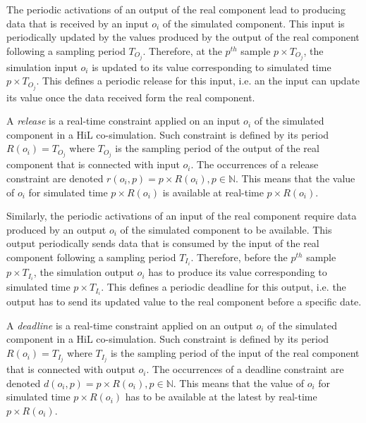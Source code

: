 The periodic activations of an output of the real component lead to producing data that is received by an input $o_i$ of the simulated component. This input is periodically updated by the values produced by the output of the real component following a sampling period $T_{O_j}$. Therefore, at the $p^{th}$ sample $p \times T_{O_j}$, the simulation input $o_i$ is updated to its value corresponding to simulated time $p \times T_{O_j}$. This defines a periodic release for this input, i.e. an the input can update its value once the data received form the real component.

\begin{definition}
A \textit{release} is a real-time constraint applied on an input $o_i$ of the simulated component in a HiL co-simulation. Such constraint is defined by its period $R(o_i) = T_{O_j}$ where $T_{O_j}$ is the sampling period of the output of the real component that is connected with input $o_i$. The occurrences of a release constraint are denoted $r(o_i,p) = p \times R(o_i), p \in \mathbb{N}$. This means that the value of $o_i$ for simulated time $p \times R(o_i)$ is available at real-time $p \times R(o_i)$.
\label{def:release}
\end{definition}

Similarly, the periodic activations of an input of the real component require data produced by an output $o_i$ of the simulated component to be available. This output periodically sends data that is consumed by the input of the real component following a sampling period $T_{I_i}$. Therefore, before the $p^{th}$ sample $p \times T_{I_i}$, the simulation output $o_i$ has to produce its value corresponding to simulated time $p \times T_{I_i}$. This defines a periodic deadline for this output, i.e. the output has to send its updated value to the real component before a specific date.

\begin{definition}
A \textit{deadline} is a real-time constraint applied on an output $o_i$ of the simulated component in a HiL co-simulation. Such constraint is defined by its period $R(o_i) = T_{I_j}$ where $T_{I_j}$ is the sampling period of the input of the real component that is connected with output $o_i$. The occurrences of a deadline constraint are denoted $d(o_i,p) = p \times R(o_i), p \in \mathbb{N}$. This means that the value of $o_i$ for simulated time $p \times R(o_i)$ has to be available at the latest by real-time $p \times R(o_i)$.
\label{def:deadline}
\end{definition}

